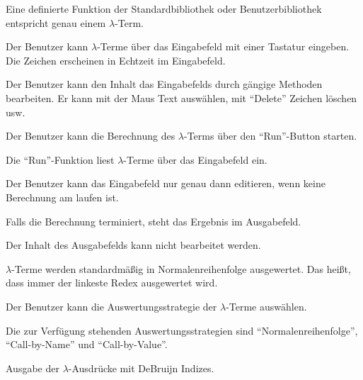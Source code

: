 \documentclass[parskip=full,11pt,twoside]{scrartcl}
\begin{document}
Eine definierte Funktion der Standardbibliothek oder Benutzerbibliothek entspricht genau einem $\lambda$-Term.

Der Benutzer kann $\lambda$-Terme über das Eingabefeld mit einer Tastatur eingeben. Die Zeichen erscheinen in Echtzeit im Eingabefeld.

Der Benutzer kann den Inhalt das Eingabefelds durch gängige Methoden bearbeiten.
Er kann mit der Maus Text auswählen, mit \enquote{Delete} Zeichen löschen usw.

Der Benutzer kann die Berechnung des $\lambda$-Terms über den \enquote{Run}-Button starten.

Die \enquote{Run}-Funktion liest $\lambda$-Terme über das Eingabefeld ein.

Der Benutzer kann das Eingabefeld nur genau dann editieren, wenn keine Berechnung am laufen ist.

Falls die Berechnung terminiert, steht das Ergebnis im Ausgabefeld.

Der Inhalt des Ausgabefelds kann nicht bearbeitet werden.

$\lambda$-Terme werden standardmäßig in Normalenreihenfolge ausgewertet.
Das heißt, dass immer der linkeste Redex ausgewertet wird.

Der Benutzer kann die Auswertungsstrategie der $\lambda$-Terme auswählen.

Die zur Verfügung stehenden Auswertungsstrategien sind \enquote{Normalenreihenfolge}, \enquote{Call-by-Name} und \enquote{Call-by-Value}.

Ausgabe der $\lambda$-Ausdrücke mit DeBruijn Indizes.
\end{document}
